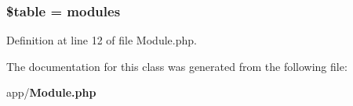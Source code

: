 \subsubsection[{\$table}]{\setlength{\rightskip}{0pt plus 5cm}\$table = \textquotesingle{}modules\textquotesingle{}\hspace{0.3cm}{\ttfamily [protected]}}\label{class_app_1_1_module_ae8876a14058f368335baccf35af4a22b}


Definition at line 12 of file Module.\+php.



The documentation for this class was generated from the following file\+:\begin{DoxyCompactItemize}
\item 
app/{\bf Module.\+php}\end{DoxyCompactItemize}
